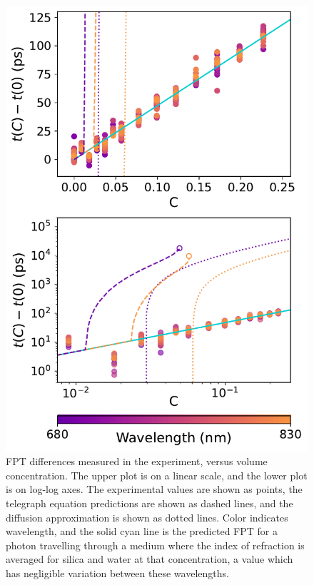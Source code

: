 \documentclass[9pt,twocolumn,twoside]{opticajnl}
\begin{document}
\begin{figure}[!h]
\includegraphics[width=\columnwidth]{lossy-N12-only-new.pdf}
\caption{\label{fig:alldata} FPT differences measured in the experiment, versus volume concentration. The upper plot is on a linear scale, and the lower plot is on log-log axes. The experimental values are shown as points, the telegraph equation predictions are shown as dashed lines, and the diffusion approximation is shown as dotted lines. Color indicates wavelength, and the solid cyan line is the predicted FPT for a photon travelling through a medium where the index of refraction is averaged for silica and water at that concentration, a value which has negligible variation between these wavelengths.}
\end{figure}
\end{document}
